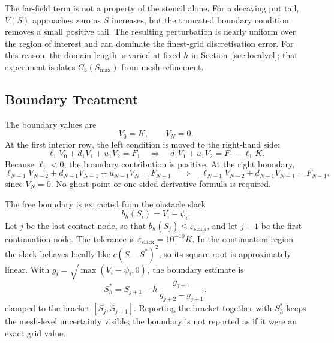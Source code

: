 \documentclass[11pt,a4paper]{article}
\theoremstyle{definition}
\theoremstyle{remark}
\begin{document}
The far-field term is not a property of the stencil alone. For a decaying put
tail, $V(S)$ approaches zero as $S$ increases, but the truncated boundary
condition removes a small positive tail. The resulting perturbation is nearly
uniform over the region of interest and can dominate the finest-grid
discretisation error. For this reason, the domain length is varied at fixed
$h$ in Section~\ref{sec:localvol}; that experiment isolates $C_3(S_{\max})$
from mesh refinement.

\subsection{Boundary Treatment}
\label{sec:boundary}
The boundary values are
\begin{equation}
    V_0=K,
    \qquad
    V_N=0.
    \label{eq:dirichlet}
\end{equation}
At the first interior row, the left condition is moved to the right-hand
side:
\begin{equation}
    \ell_1V_0+d_1V_1+u_1V_2=F_1
    \quad\Longrightarrow\quad
    d_1V_1+u_1V_2=F_1-\ell_1K.
    \label{eq:leftrhs}
\end{equation}
Because $\ell_1<0$, the boundary contribution is positive. At the right
boundary,
\begin{equation}
    \ell_{N-1}V_{N-2}+d_{N-1}V_{N-1}+u_{N-1}V_N=F_{N-1}
    \quad\Longrightarrow\quad
    \ell_{N-1}V_{N-2}+d_{N-1}V_{N-1}=F_{N-1},
    \label{eq:rightrhs}
\end{equation}
since $V_N=0$. No ghost point or one-sided derivative formula is required.

The free boundary is extracted from the obstacle slack
\begin{equation}
    b_h(S_i)=V_i-\psi_i.
    \label{eq:slack}
\end{equation}
Let $j$ be the last contact node, so that
$b_h(S_j)\le\varepsilon_{\mathrm{slack}}$, and let $j+1$ be the first
continuation node. The tolerance is
$\varepsilon_{\mathrm{slack}}=10^{-10}K$. In the continuation region the
slack behaves locally like $c(S-S^*)^2$, so its square root is approximately
linear. With $g_i=\sqrt{\max(V_i-\psi_i,0)}$, the boundary estimate is
\begin{equation}
    S_h^*=S_{j+1}
    -h\,\frac{g_{j+1}}{g_{j+2}-g_{j+1}},
    \label{eq:interpolation}
\end{equation}
clamped to the bracket $[S_j,S_{j+1}]$. Reporting the bracket together with
$S_h^*$ keeps the mesh-level uncertainty visible; the boundary is not
reported as if it were an exact grid value.
\end{document}
